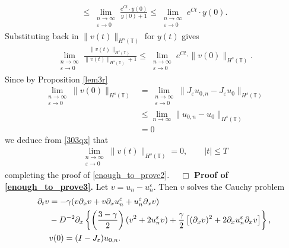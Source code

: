 \documentclass[12pt,reqno]{amsart}
\newcommand{\p}{\partial}
\newcommand{\ci}{\mathbb{T}}
\newcommand{\ee}{\varepsilon}
\theoremstyle{plain}  %
\theoremstyle{definition}
\begin{document}
\begin{appendices}
\begin{equation*}
\begin{split}
		\le \lim_{\substack{n \to \infty \\ \ee \to 0}} \frac{e^{C t} \cdot y(0)}{y(0) + 1} \le
		\lim_{\substack{n \to \infty \\ \ee \to 0}} e^{C t} \cdot y(0).
	\end{split}
\end{equation*}
Substituting back in $\|v(t)\|_{H^s(\ci)}$ for $y(t)$ gives
\begin{equation}
	\begin{split}
		\lim_{\substack{n \to \infty \\ \ee \to 0}}	\frac{\|v(t)\|_{H^s(\ci)}}{\|v(t)\|_{H^s(\ci)} + 1}  \le
		\lim_{\substack{n \to \infty \\ \ee \to 0}} e^{C t} \cdot \|v(0)\|_{H^s(\ci)}.
		\label{303qx}
	\end{split}
\end{equation}
Since by Proposition \ref{lem3r} 
\begin{equation*}
	\begin{split}
	\lim_{\substack{n \to \infty \\ \ee \to 0} }
	\|v(0)\|_{H^s(\ci)}
	& = \lim_{\substack{n \to \infty \\ \ee \to 0} }
	\|J_\ee u_{0,n} - J_\ee u_0 \|_{H^s(\ci)} 
	\\
	& \le \lim_{n \to \infty } \|u_{0,n} - u_0 \|_{H^s(\ci)}
	\\
	& = 0
	\end{split}
\end{equation*}
we deduce from \eqref{303qx} that
\begin{equation*}
	\begin{split}
		\lim_{\substack{n \to \infty \\ \ee \to 0}} \|v(t)\|_{H^s(\ci)} = 0, \qquad |t| \le T
	\end{split}
\end{equation*}
completing the proof of \eqref{enough_to_prove2}. $\quad \Box$
%
%
%
\vskip0.1in
{\bf Proof of \eqref{enough_to_prove3}.} 
Let $v = u_n - u^\ee_n$. Then $v$ solves the Cauchy problem
\begin{align}
		\label{a4qu}
		\p_t v 
		& =  -\gamma (v \p_x v + v \p_x u^\ee_n + u^\ee_n \p_x v)  
		\\
		& - D^{-2} \p_x \left\{ \left (\frac{3-\gamma}{2} \right )(v^2 +
		2u^\ee_n v) + \frac{\gamma}{2}\left[ (\p_x v)^2 + 2 \p_x u^\ee_n \p_x v \right]
		\right\}, \notag
		\\
		& v(0) = (I- J_\ee)u_{0,n}.
		\label{a5qu}
	\end{align}

\end{appendices}
\end{document}
